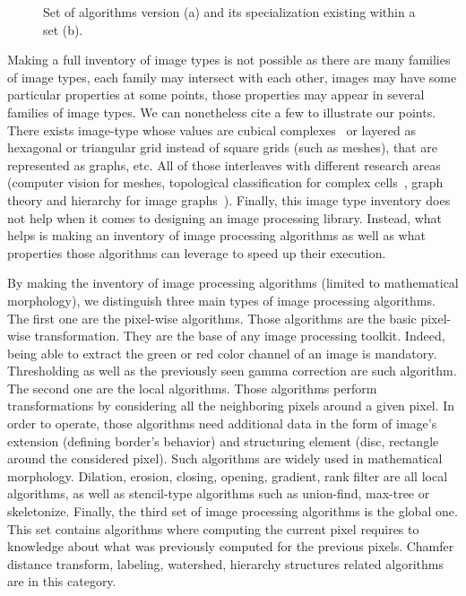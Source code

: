 \begin{figure}[htbp]
  \centering
  \hfil
  \caption{Set of algorithms version (a) and its specialization existing within a set (b).}
  \label{fig:image.version.vs.specialization}
\end{figure}

Making a full inventory of image types is not possible as there are many families of image types, each family may
intersect with each other, images may have some particular properties at some points, those properties may appear in
several families of image types. We can nonetheless cite a few to illustrate our points. There exists image-type whose
values are cubical complexes~\parencite{ziou.2002.cubical-complex} or layered as hexagonal or triangular grid instead of
square grids (such as meshes), that are represented as graphs, etc. All of those interleaves with different research
areas (computer vision for meshes, topological classification for complex
cells~\parencite{movn.20.cviu,allili.2001.cubical}, graph theory and hierarchy for image
graphs~\parencite{carlinet.2014.tip,carlinet.2015.tip,perret.2019.higra}). Finally, this image type inventory does not
help when it comes to designing an image processing library. Instead, what helps is making an inventory of image
processing algorithms as well as what properties those algorithms can leverage to speed up their execution.

By making the inventory of image processing algorithms (limited to mathematical morphology), we distinguish three main
types of image processing algorithms. The first one are the pixel-wise algorithms. Those algorithms are the basic
pixel-wise transformation. They are the base of any image processing toolkit. Indeed, being able to extract the green or
red color channel of an image is mandatory. Thresholding as well as the previously seen gamma correction are such
algorithm. The second one are the local algorithms. Those algorithms perform transformations by considering all the
neighboring pixels around a given pixel. In order to operate, those algorithms need additional data in the form of
image's extension (defining border's behavior) and structuring element (disc, rectangle around the considered pixel).
Such algorithms are widely used in mathematical morphology. Dilation, erosion, closing, opening, gradient, rank filter
are all local algorithms, as well as stencil-type algorithms such as union-find, max-tree or skeletonize. Finally, the
third set of image processing algorithms is the global one. This set contains algorithms where computing the current
pixel requires to knowledge about what was previously computed for the previous pixels. Chamfer distance transform,
labeling, watershed, hierarchy structures related algorithms are in this category.


